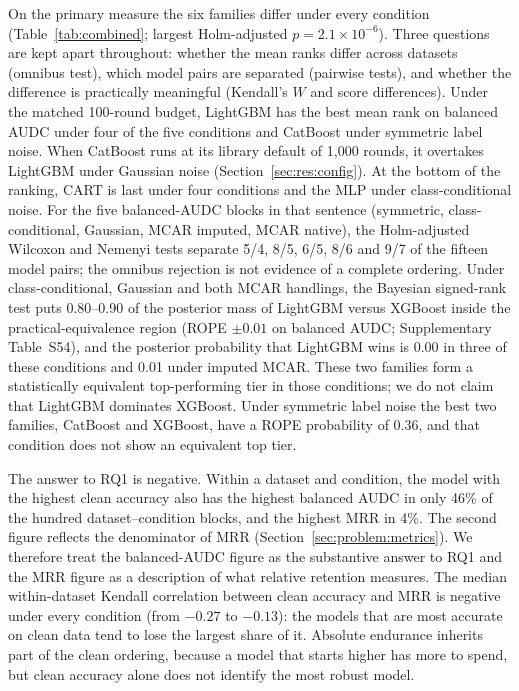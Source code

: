 \documentclass[pdflatex,sn-mathphys]{sn-jnl}
\theoremstyle{thmstyleone}
\theoremstyle{thmstyletwo}
\theoremstyle{thmstylethree}
\begin{document}
On the primary measure the six families differ under every condition (Table~\ref{tab:combined}; largest Holm-adjusted $p=2.1\times10^{-6}$). Three questions are kept apart throughout: whether the mean ranks differ across datasets (omnibus test), which model pairs are separated (pairwise tests), and whether the difference is practically meaningful (Kendall's $W$ and score differences). Under the matched 100-round budget, LightGBM has the best mean rank on balanced AUDC under four of the five conditions and CatBoost under symmetric label noise. When CatBoost runs at its library default of 1{,}000 rounds, it overtakes LightGBM under Gaussian noise (Section~\ref{sec:res:config}). At the bottom of the ranking, CART is last under four conditions and the MLP under class-conditional noise. For the five balanced-AUDC blocks in that sentence (symmetric, class-conditional, Gaussian, MCAR imputed, MCAR native), the Holm-adjusted Wilcoxon and Nemenyi tests separate 5/4, 8/5, 6/5, 8/6 and 9/7 of the fifteen model pairs; the omnibus rejection is not evidence of a complete ordering. Under class-conditional, Gaussian and both MCAR handlings, the Bayesian signed-rank test puts 0.80--0.90 of the posterior mass of LightGBM versus XGBoost inside the practical-equivalence region (ROPE $\pm0.01$ on balanced AUDC; Supplementary Table~S54), and the posterior probability that LightGBM wins is 0.00 in three of these conditions and 0.01 under imputed MCAR. These two families form a statistically equivalent top-performing tier in those conditions; we do not claim that LightGBM dominates XGBoost. Under symmetric label noise the best two families, CatBoost and XGBoost, have a ROPE probability of 0.36, and that condition does not show an equivalent top tier.

The answer to RQ1 is negative. Within a dataset and condition, the model with the highest clean accuracy also has the highest balanced AUDC in only 46\% of the hundred dataset--condition blocks, and the highest MRR in 4\%. The second figure reflects the denominator of MRR (Section~\ref{sec:problem:metrics}). We therefore treat the balanced-AUDC figure as the substantive answer to RQ1 and the MRR figure as a description of what relative retention measures. The median within-dataset Kendall correlation between clean accuracy and MRR is negative under every condition (from $-0.27$ to $-0.13$): the models that are most accurate on clean data tend to lose the largest share of it. Absolute endurance inherits part of the clean ordering, because a model that starts higher has more to spend, but clean accuracy alone does not identify the most robust model.
\end{document}
